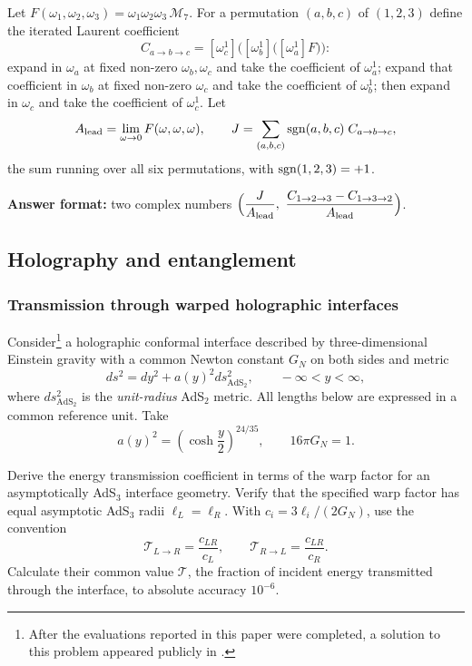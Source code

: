 Let $F(\omega_1,\omega_2,\omega_3)=\omega_1\omega_2\omega_3\,\mathcal M_7$. For a permutation $(a,b,c)$ of $(1,2,3)$ define the iterated Laurent coefficient
\[
C_{a\to b\to c}=[\omega_c^{1}]\Big([\omega_b^{1}]\big([\omega_a^{1}]F\big)\Big):
\]
expand in $\omega_a$ at fixed non-zero $\omega_b,\omega_c$ and take the coefficient of $\omega_a^1$; expand that coefficient in $\omega_b$ at fixed non-zero $\omega_c$ and take the coefficient of $\omega_b^1$; then expand in $\omega_c$ and take the coefficient of $\omega_c^1$. Let
\[
A_{\rm lead}=\lim_{\omega\to0}F(\omega,\omega,\omega),\qquad
J=\sum_{(a,b,c)}{\rm sgn}(a,b,c)\;C_{a\to b\to c},
\]
the sum running over all six permutations, with ${\rm sgn}(1,2,3)=+1$.

\textbf{Answer format:} two complex numbers $\Big(\dfrac{J}{A_{\rm lead}},\ \dfrac{C_{1\to2\to3}-C_{1\to3\to2}}{A_{\rm lead}}\Big)$.


\subsection{Holography and entanglement}
\label{problems:holography}

\subsubsection{Transmission through warped holographic interfaces}
\label{problem:interface-transmission}
Consider\footnote{After the evaluations reported in this paper were completed, a solution to this problem appeared publicly in \cite{Arav:2026bbn}.} a holographic conformal interface described by three-dimensional
Einstein gravity with a common Newton constant $G_N$ on both sides and metric
\[
ds^2=dy^2+a(y)^2ds^2_{\mathrm{AdS}_2},\qquad -\infty<y<\infty,
\]
where $ds^2_{\mathrm{AdS}_2}$ is the \emph{unit-radius} AdS$_2$ metric.
All lengths below are expressed in a common reference unit. Take
\[
a(y)^2=\left(\cosh\frac{y}{2}\right)^{24/35},
\qquad 16\pi G_N=1.
\]

Derive the energy transmission coefficient in terms of the warp factor
for an asymptotically AdS$_3$ interface geometry. Verify that the specified
warp factor has equal asymptotic AdS$_3$ radii $\ell_L=\ell_R$.
With $c_i=3\ell_i/(2G_N)$, use the convention
\[
\mathcal T_{L\to R}=\frac{c_{LR}}{c_L},\qquad
\mathcal T_{R\to L}=\frac{c_{LR}}{c_R}.
\]
Calculate their common value $\mathcal T$, the fraction of incident energy
transmitted through the interface, to absolute accuracy $10^{-6}$.


